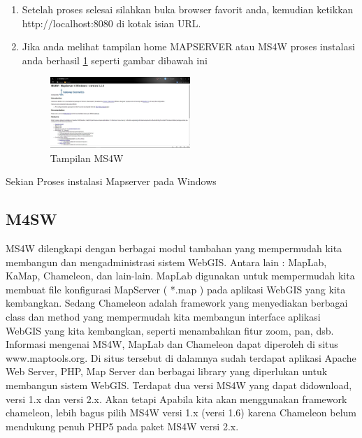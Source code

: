 \begin{enumerate}
\begin{figure}[ht]
		\end{figure}
\item
Setelah proses selesai silahkan buka browser favorit anda, kemudian ketikkan http://localhost:8080 di kotak isian URL.
\item
Jika anda melihat tampilan home MAPSERVER atau MS4W proses instalasi anda berhasil \ref{gambar4} seperti gambar dibawah ini
\begin{figure}[ht]
	    \centerline{\includegraphics[width=0.50\textwidth]{figures/gambar4.JPG}}
	    \caption{Tampilan MS4W}
		\label{gambar4}
		\end{figure}
\end{enumerate}
Sekian Proses instalasi Mapserver pada Windows

\subsection{M4SW}
MS4W dilengkapi dengan berbagai modul tambahan yang mempermudah kita membangun dan mengadministrasi sistem WebGIS. Antara lain : MapLab, KaMap, Chameleon, dan lain-lain. MapLab digunakan untuk mempermudah kita membuat file konfigurasi MapServer ( *.map ) pada aplikasi WebGIS yang kita kembangkan. Sedang Chameleon adalah framework yang menyediakan berbagai class dan method yang mempermudah kita membangun interface aplikasi WebGIS yang kita kembangkan, seperti menambahkan fitur zoom, pan, dsb. Informasi mengenai MS4W, MapLab dan Chameleon dapat diperoleh di situs www.maptools.org. Di situs tersebut di dalamnya sudah terdapat aplikasi Apache Web Server, PHP, Map Server dan berbagai library yang diperlukan untuk membangun sistem WebGIS. Terdapat dua versi MS4W yang dapat didownload, versi 1.x dan versi 2.x. Akan tetapi Apabila kita akan menggunakan framework chameleon, lebih bagus pilih MS4W versi 1.x (versi 1.6) karena Chameleon belum mendukung penuh PHP5 pada paket MS4W versi 2.x.

